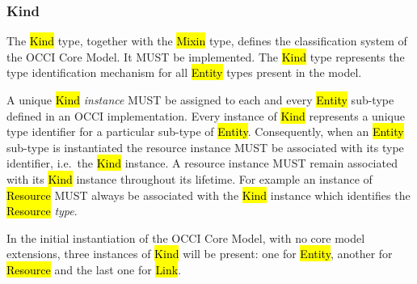\documentclass[10pt,a4paper]{article}
\begin{document}
\subsubsection{Kind}
\label{sec:kind}

The \hl{Kind} type, together with the \hl{Mixin} type, defines the
classification system of the OCCI Core Model. It MUST be implemented. The \hl{Kind}
type represents the type identification mechanism for all \hl{Entity} types present in
the model.

A unique \hl{Kind} {\em instance} MUST be assigned to each and every
\hl{Entity} sub-type defined in an OCCI implementation.
%
Every instance of \hl{Kind} represents a unique type identifier for a
particular sub-type of \hl{Entity}.  Consequently, when an \hl{Entity} sub-type
is instantiated the resource instance MUST be associated with its type
identifier, i.e.~the \hl{Kind} instance.  A resource instance MUST remain
associated with its \hl{Kind} instance throughout its lifetime.
%
For example an instance of \hl{Resource} MUST always be associated with the
\hl{Kind} instance which identifies the \hl{Resource} {\em type}.

In the initial instantiation of the OCCI Core Model, with no core model
extensions, three instances of \hl{Kind} will be present: one for \hl{Entity},
another for \hl{Resource} and the last one for \hl{Link}. 
\end{document}
